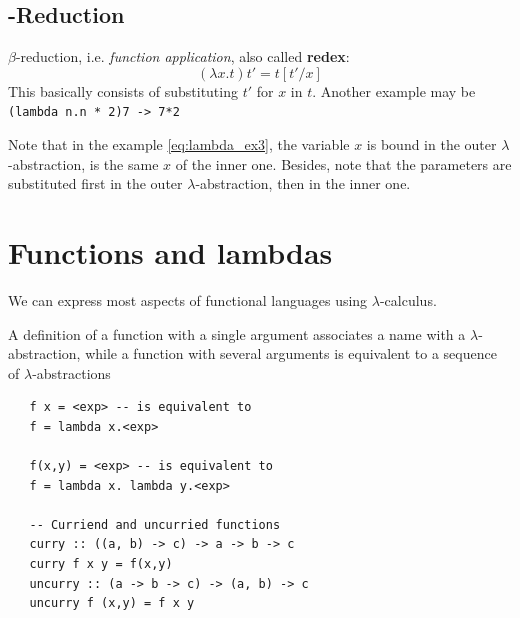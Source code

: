 \subsection*{\texorpdfstring{\bm{$\beta $}}{}-Reduction}
$\beta $-reduction, i.e. \textit{function application}, also called \textbf{redex}:
\[(\lambda x.t)t' = t[t'/x]\]
This basically consists of substituting $t'$ for $x$ in $t$. Another example may be 
\lstinline|(lambda n.n * 2)7 -> 7*2|

Note that in the example \ref{eq:lambda_ex3}, the variable $x$ is bound in the outer $\lambda$-abstraction, is the same $x$ of the inner one. Besides, note that the parameters are substituted first in the outer $\lambda$-abstraction, then in the inner one.

\section{Functions and lambdas}
We can express most aspects of functional languages using $\lambda$-calculus.

A definition of a function with a single argument
associates a name with a $\lambda$-abstraction,
while
a function with several arguments is equivalent to a
sequence of $\lambda$-abstractions
\begin{lstlisting}
   f x = <exp> -- is equivalent to
   f = lambda x.<exp>
   
   f(x,y) = <exp> -- is equivalent to
   f = lambda x. lambda y.<exp>

   -- Curriend and uncurried functions
   curry :: ((a, b) -> c) -> a -> b -> c
   curry f x y = f(x,y)
   uncurry :: (a -> b -> c) -> (a, b) -> c
   uncurry f (x,y) = f x y
\end{lstlisting}

